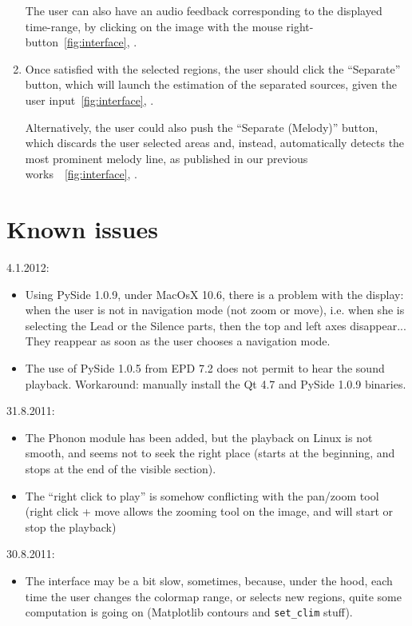 \documentclass{article}
\newcommand\circled[1]{\raisebox{.5pt}{\textcircled{\raisebox{-.9pt} {#1}}}}
\begin{document}
\begin{enumerate}
   The user can 
   also have an audio feedback corresponding to the displayed time-range,
   by clicking on the image with the mouse right-button~\ref{fig:interface}, \circled{5}. 

\item Once satisfied with the selected regions, the user should click the
   ``Separate'' button, which will launch the estimation of the separated
   sources, given the user input~\ref{fig:interface}, \circled{10}. 
   
   Alternatively, the user could also push the ``Separate (Melody)'' button,
   which discards the user selected areas and, instead, automatically detects
   the most prominent melody line, as published in our previous works~\cite{Durrieu2010}~\ref{fig:interface}, \circled{10}.
\end{enumerate}

\section{Known issues}
4.1.2012:
\begin{itemize}
\item Using PySide 1.0.9, under MacOsX 10.6, there is a problem with the display: when the user is not in navigation mode (not zoom or move), i.e. when she is selecting the Lead or the Silence parts, then the top and left axes disappear... They reappear as soon as the user chooses a navigation mode. 
\item The use of PySide 1.0.5 from EPD 7.2 does not permit to hear the sound playback. Workaround: manually install the Qt 4.7 and PySide 1.0.9 binaries. 
\end{itemize}

31.8.2011: 
\begin{itemize}
\item The Phonon module has been added, but the playback on Linux is 
      not smooth, and seems not to seek the right place (starts at the 
      beginning, and stops at the end of the visible section).
\item The ``right click to play'' is somehow conflicting with the pan/zoom 
      tool (right click + move allows the zooming tool on the image, and 
      will start or stop the playback)
\end{itemize}

30.8.2011:
\begin{itemize}
\item The interface may be a bit slow, sometimes, because, under the hood, 
      each time the user changes the colormap range, or selects new regions,
      quite some computation is going on (Matplotlib contours and \texttt{set\_clim}
      stuff).
\end{itemize}
\end{document}
